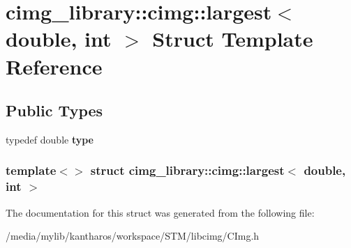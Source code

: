 \hypertarget{structcimg__library_1_1cimg_1_1largest_3_01double_00_01int_01_4}{
\section{cimg\_\-library::cimg::largest$<$ double, int $>$ Struct Template Reference}
\label{structcimg__library_1_1cimg_1_1largest_3_01double_00_01int_01_4}
}
\subsection*{Public Types}
\begin{DoxyCompactItemize}
\item 
\hypertarget{structcimg__library_1_1cimg_1_1largest_3_01double_00_01int_01_4_acf7ceeb67875a7cdefec6ebb7d5fd5b7}{
typedef double {\bfseries type}}
\label{structcimg__library_1_1cimg_1_1largest_3_01double_00_01int_01_4_acf7ceeb67875a7cdefec6ebb7d5fd5b7}

\end{DoxyCompactItemize}
\subsubsection*{template$<$$>$ struct cimg\_\-library::cimg::largest$<$ double, int $>$}



The documentation for this struct was generated from the following file:\begin{DoxyCompactItemize}
\item 
/media/mylib/kantharos/workspace/STM/libcimg/CImg.h\end{DoxyCompactItemize}
